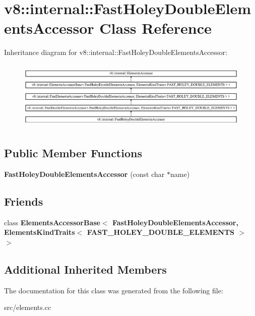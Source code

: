 \hypertarget{classv8_1_1internal_1_1_fast_holey_double_elements_accessor}{}\section{v8\+:\+:internal\+:\+:Fast\+Holey\+Double\+Elements\+Accessor Class Reference}
\label{classv8_1_1internal_1_1_fast_holey_double_elements_accessor}
Inheritance diagram for v8\+:\+:internal\+:\+:Fast\+Holey\+Double\+Elements\+Accessor\+:\begin{figure}[H]
\begin{center}
\leavevmode
\includegraphics[height=3.365385cm]{classv8_1_1internal_1_1_fast_holey_double_elements_accessor}
\end{center}
\end{figure}
\subsection*{Public Member Functions}
\begin{DoxyCompactItemize}
\item 
\hypertarget{classv8_1_1internal_1_1_fast_holey_double_elements_accessor_acf0406506c7d6f0dc536721726ff7542}{}{\bfseries Fast\+Holey\+Double\+Elements\+Accessor} (const char $\ast$name)\label{classv8_1_1internal_1_1_fast_holey_double_elements_accessor_acf0406506c7d6f0dc536721726ff7542}

\end{DoxyCompactItemize}
\subsection*{Friends}
\begin{DoxyCompactItemize}
\item 
\hypertarget{classv8_1_1internal_1_1_fast_holey_double_elements_accessor_a9aa8c532c09f4e12e57bf2663f1e596f}{}class {\bfseries Elements\+Accessor\+Base$<$ Fast\+Holey\+Double\+Elements\+Accessor, Elements\+Kind\+Traits$<$ F\+A\+S\+T\+\_\+\+H\+O\+L\+E\+Y\+\_\+\+D\+O\+U\+B\+L\+E\+\_\+\+E\+L\+E\+M\+E\+N\+T\+S $>$ $>$}\label{classv8_1_1internal_1_1_fast_holey_double_elements_accessor_a9aa8c532c09f4e12e57bf2663f1e596f}

\end{DoxyCompactItemize}
\subsection*{Additional Inherited Members}


The documentation for this class was generated from the following file\+:\begin{DoxyCompactItemize}
\item 
src/elements.\+cc\end{DoxyCompactItemize}
